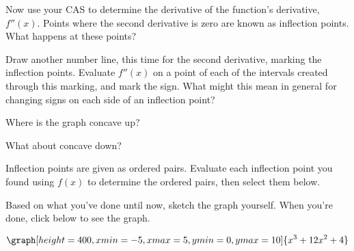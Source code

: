 \documentclass{ximera}
\begin{document}
\begin{question}

Now use your CAS to determine the derivative of the function's derivative, $f''(x)$. Points where the second derivative is zero are known as inflection points. What happens at these points?

\begin{multipleChoice}
\end{multipleChoice}

Draw another number line, this time for the second derivative, marking the inflection points. Evaluate $f''(x)$ on a point of each of the intervals created through this marking, and mark the sign. What might this mean in general for changing signs on each side of an inflection point?

\begin{selectAll}
\end{selectAll}

Where is the graph concave up?
\begin{multipleChoice}
\choice{$[0,1]$}
\choice[correct]{$[-4, \infty)$}
\choice{$(-\infty, 0]$}
\choice{$[0,260]$}
\choice{$[4,260]$}
\end{multipleChoice}

What about concave down?

\begin{multipleChoice}
\choice{$[0,1]$}
\choice{$[-4, \infty)$}
\choice[correct]{$(-\infty, -4]$}
\choice{$[0,260]$}
\choice{$[4,260]$}
\end{multipleChoice}

Inflection points are given as ordered pairs. Evaluate each inflection point you found using $f(x)$ to determine the ordered pairs, then select them below.
\begin{selectAll}
\end{selectAll}

Based on what you've done until now, sketch the graph yourself. When you're done, click below to see the graph.

\begin{multipleChoice}
\end{multipleChoice}
\begin{feedback}
\[
\graph[height=400,xmin=-5,xmax=5,ymin=0,ymax=10]{x^3+12x^2+4}
\]
\end{feedback}
\end{question}
\end{document}
